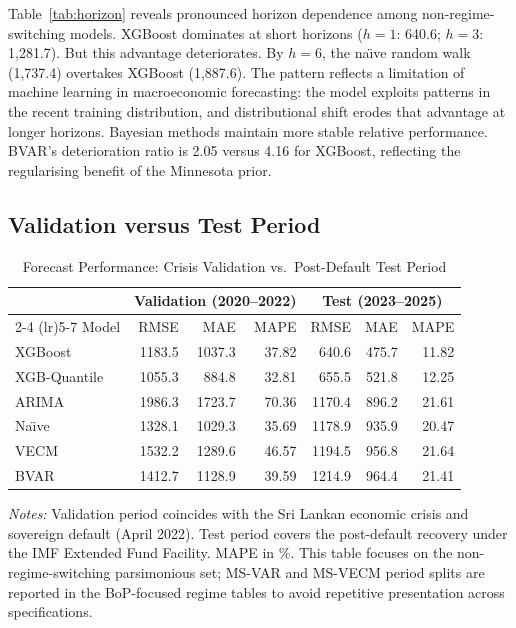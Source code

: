 \documentclass[12pt,a4paper]{article}
\begin{document}
Table~\ref{tab:horizon} reveals pronounced horizon dependence among non-regime-switching models. XGBoost dominates at short horizons ($h=1$: 640.6; $h=3$: 1,281.7). But this advantage deteriorates. By $h=6$, the na\"{\i}ve random walk (1,737.4) overtakes XGBoost (1,887.6). The pattern reflects a limitation of machine learning in macroeconomic forecasting: the model exploits patterns in the recent training distribution, and distributional shift erodes that advantage at longer horizons. Bayesian methods maintain more stable relative performance. BVAR's deterioration ratio is 2.05 versus 4.16 for XGBoost, reflecting the regularising benefit of the Minnesota prior.

\subsection{Validation versus Test Period}

\begin{table}[htbp]
\centering
\caption{Forecast Performance: Crisis Validation vs.\ Post-Default Test Period}
\label{tab:val_vs_test}
\begin{tabular}{lrrr@{\hskip 12pt}rrr}
\toprule
& \multicolumn{3}{c}{Validation (2020--2022)} & \multicolumn{3}{c}{Test (2023--2025)} \\
\cmidrule(lr){2-4} \cmidrule(lr){5-7}
Model & RMSE & MAE & MAPE & RMSE & MAE & MAPE \\
\midrule
XGBoost & 1183.5 & 1037.3 & 37.82 & 640.6 & 475.7 & 11.82 \\
XGB-Quantile & 1055.3 & 884.8 & 32.81 & 655.5 & 521.8 & 12.25 \\
ARIMA & 1986.3 & 1723.7 & 70.36 & 1170.4 & 896.2 & 21.61 \\
Na\"{\i}ve & 1328.1 & 1029.3 & 35.69 & 1178.9 & 935.9 & 20.47 \\
VECM & 1532.2 & 1289.6 & 46.57 & 1194.5 & 956.8 & 21.64 \\
BVAR & 1412.7 & 1128.9 & 39.59 & 1214.9 & 964.4 & 21.41 \\
\bottomrule
\end{tabular}
\begin{tablenotes}
\small
\item \textit{Notes:} Validation period coincides with the Sri Lankan economic crisis and sovereign default (April 2022). Test period covers the post-default recovery under the IMF Extended Fund Facility. MAPE in \%. This table focuses on the non-regime-switching parsimonious set; MS-VAR and MS-VECM period splits are reported in the BoP-focused regime tables to avoid repetitive presentation across specifications.
\end{tablenotes}
\end{table}
\end{document}
